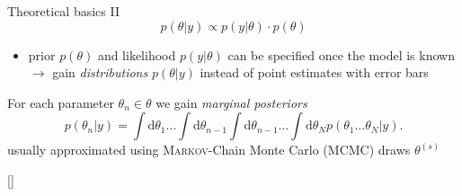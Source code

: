 \documentclass[11pt,aspectratio=169,dvipsnames]{beamer}
\newcommand{\thecolor}{black!70!blue}
\begin{document}
\begin{frame}{Theoretical basics II}
	$$p(\theta|y)\propto p(y|\theta)\cdot p(\theta)$$
		\begin{itemize}
			\item prior $p(\theta)$ and likelihood $p(y|\theta)$ can be specified once the model is known \\
			$\to$ gain \emph{distributions} $p(\theta|y)$ instead of point estimates with error bars
		\end{itemize}
		\begin{tcolorbox}[colback=blue!5,colframe=\thecolor,title=\textsc{Bayesian} parameter inference]
			For each parameter $\theta_n\in\theta$ we gain \emph{marginal posteriors}
			\begin{equation*}
				\label{eq:marpost}
				p(\theta_n|y)=\int\text{d}\theta_1\dots\int\text{d}\theta_{n-1}\int\text{d}\theta_{n-1}\dots\int\text{d}\theta_Np(\theta_1\dots\theta_N|y).
			\end{equation*}
		usually approximated using \textsc{Markov}-Chain Monte Carlo (MCMC) draws $\theta^{(s)}$
			\begin{flushright}
				{\scriptsize[\cite{sivia}]}
			\end{flushright}
		\end{tcolorbox}
	\end{frame}
\end{document}
